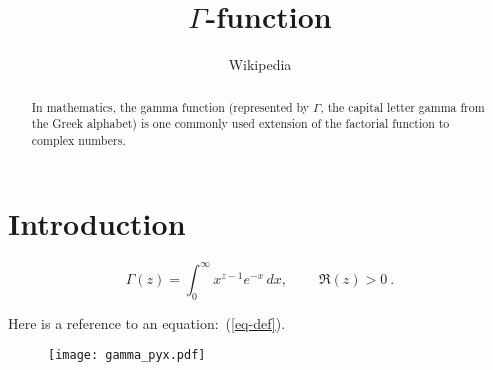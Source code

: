 \documentclass[twocolumn,a4paper]{article}
\begin{document}
\title{$\Gamma$-function}
\author{Wikipedia}
\maketitle

\begin{abstract}
In mathematics, the gamma function (represented by $\Gamma$, the capital letter
gamma from the Greek alphabet) is one commonly used extension of the
factorial function to complex numbers.
\end{abstract}

\section{Introduction}

\begin{equation}\label{eq-def}
\Gamma(z) = \int_0^\infty x^{z-1} e^{-x}\,dx, \ \qquad \Re(z) > 0\ .
\end{equation}

Here is a reference to an equation:~(\ref{eq-def}).

\begin{figure}[b]
\texttt{[image: gamma\_pyx.pdf]}
\end{figure}

\begin{figure}[b]

\end{figure}
\end{document}
